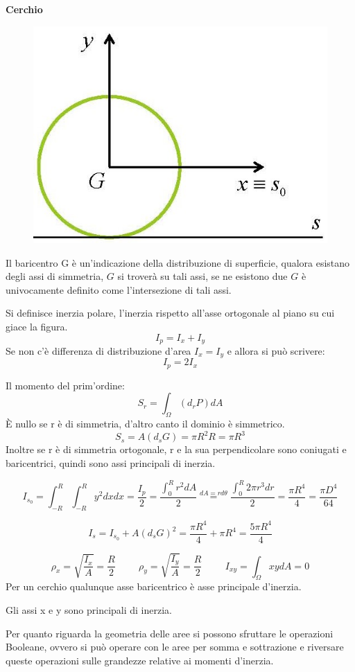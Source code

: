 \documentclass{article}
\begin{document}
\begin{adjustwidth}{2in}{}
{\Large \textbf{Cerchio}} \mbox{} \newline
\begin{figure}[H]
	\centering
	\includegraphics[width=0.25\linewidth]{immagini/1.PARTE7_Pagina_77}
\end{figure}
	Il baricentro G è un'indicazione della distribuzione di superficie, qualora esistano degli assi di simmetria, $G$ si troverà su tali assi, se ne esistono due $G$ è univocamente definito come l'intersezione di tali assi. \newline 
	
	Si definisce inerzia polare, l'inerzia rispetto all'asse ortogonale al piano su cui giace la figura. 
	\[I_p = I_x + I_y\] 
	Se non c'è differenza di distribuzione d'area $ I_x = I_y $ e allora si può scrivere:
	\[ I_p = 2I_x\]
	
	Il momento del prim'ordine:
	\[ S_r = \int_{\Omega} (d_rP)dA\]
	È nullo se r è di simmetria, d'altro canto il dominio è simmetrico. 
	\[S_s = A (d_sG) = \pi R^2R = \pi R^3\]
	Inoltre se r è di simmetria ortogonale, r e la sua
	perpendicolare sono coniugati e baricentrici,
	quindi sono assi principali di inerzia. \newline 
	
	\[ I_{s_0} = \int_{-R}^{R} \int_{-R}^{R} y^2 dxdx = \dfrac{I_p}{2}=\dfrac{\int_{0}^{R}r^2dA}{2} \overset{dA=rd\theta}{=} \dfrac{\int_{0}^{R}2\pi r^3dr}{2} = \dfrac{\pi R^4}{4} = \dfrac{\pi D^4}{64}\]
	
	\[ I_s = I_{s_0} + A(d_sG)^2 = \dfrac{\pi R^4}{4} + \pi R^4 = \dfrac{5\pi R^4}{4} \]
	
	\[ \rho_x = \sqrt{\dfrac{I_x}{A}} = \dfrac{R}{2} \hspace{1cm} \rho_y = \sqrt{\dfrac{I_y}{A}} = \dfrac{R}{2} \hspace{1cm} I_{xy} = \int_{\Omega}xydA = 0 \]
	Per un cerchio qualunque asse baricentrico è asse principale d'inerzia. \newline
	
	Gli assi x e y sono principali di inerzia.
	
\newpage
	Per quanto riguarda la geometria delle aree si possono sfruttare le operazioni Booleane, ovvero si può operare con le aree per somma e sottrazione e riversare queste operazioni sulle grandezze relative ai momenti d'inerzia. \newline
	

\end{adjustwidth}
\end{document}
